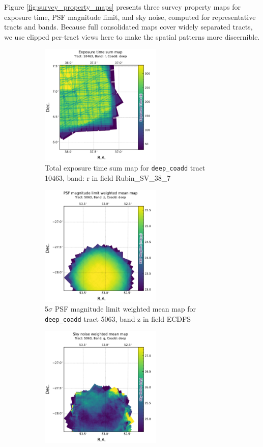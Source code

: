 Figure \ref{fig:survey_property_maps} presents three survey property maps for exposure time, \gls{PSF} magnitude limit, and sky noise, computed for representative tracts and bands.
Because full consolidated maps cover widely separated tracts, we use clipped per-\gls{tract} views here to make the spatial patterns more discernible.
\begin{figure}[hbt!]
  \centering
  \begin{subfigure}[t]{0.31\textwidth}
  \includegraphics[width=\linewidth, height=5.8cm]{deepCoadd_exposure_time_map_sum_tract10463_rband.pdf}
  \caption{Total exposure time sum map for   \texttt{deep\_coadd} \gls{tract} 10463, band: r in field Rubin\_SV\_38\_7}
  \end{subfigure}\hfill
  \begin{subfigure}[t]{0.31\textwidth}
  \includegraphics[width=\linewidth, height=5.8cm]{deepCoadd_psf_maglim_map_weighted_mean_tract5063_zband.pdf}
  \caption{5$\sigma$ \gls{PSF} magnitude limit weighted mean map for \texttt{deep\_coadd} \gls{tract} 5063, band z in field ECDFS}
  \end{subfigure}\hfill
    \begin{subfigure}[t]{0.31\textwidth}
  \includegraphics[width=\linewidth, height=5.8cm]{deepCoadd_sky_noise_map_weighted_mean_tract5063_gband.pdf}

\end{subfigure}
\end{figure}
